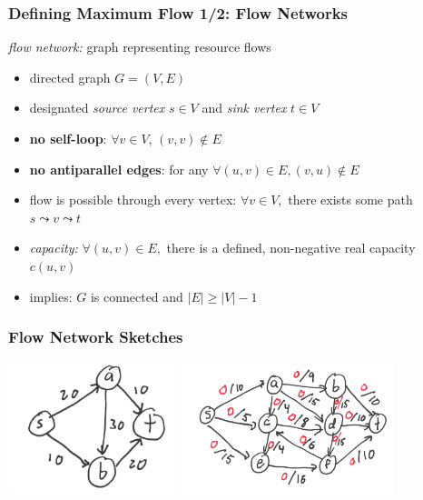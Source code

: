 \documentclass{beamer}
\begin{document}
\begin{frame} \frametitle{Defining Maximum Flow 1/2: Flow Networks}
\emph{flow network:} graph representing resource flows
\begin{itemize}
  \item directed graph $G=(V, E)$
  \item designated \emph{source vertex} $s \in V$ and \emph{sink vertex} $t \in V$
  \item \textbf{no self-loop}: $\forall v \in V$, $(v, v) \notin E$
  \item \textbf{no antiparallel edges}: for any $\forall (u, v) \in E, (v, u) \notin E$
  \item flow is possible through every vertex: $\forall v \in V,$ there exists
    some path $s \leadsto v \leadsto t$
  \item \emph{capacity:} $\forall (u, v) \in E,$ there is a defined,
    non-negative real capacity $c(u, v)$
  \item implies: $G$ is connected and $|E| \geq |V|-1$
\end{itemize}
\end{frame}

\begin{frame} \frametitle{Flow Network Sketches}
\begin{center}
  \includegraphics[height=1.5in]{flownetwork-1.png} \includegraphics[height=1.5in]{flownetwork-2.png}
\end{center}
\end{frame}
\end{document}
